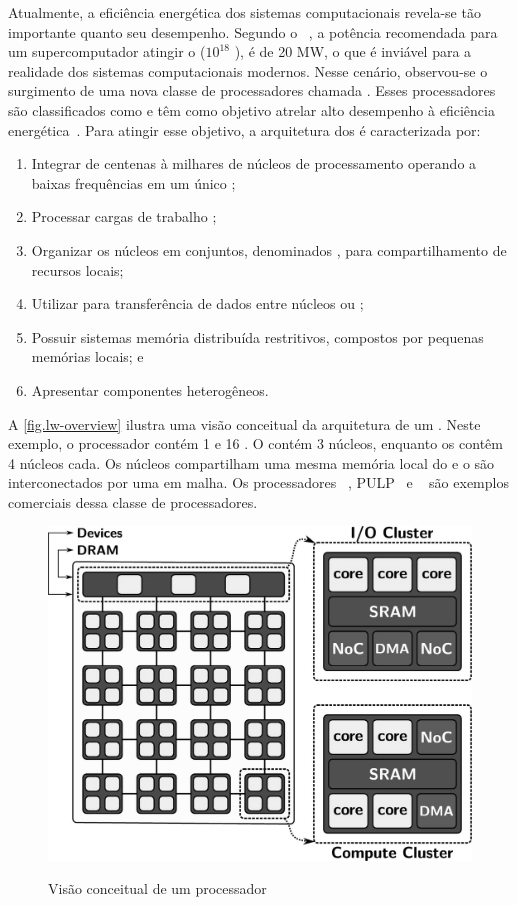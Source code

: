 Atualmente, a eficiência energética dos sistemas computacionais revela-se tão importante quanto seu desempenho. Segundo o \darpa~\cite{darpa:exascale}, a potência recomendada para um supercomputador atingir o \exascale ($10^{18}$ \flops), é de 20 MW, o que é inviável para a realidade dos sistemas computacionais modernos. Nesse cenário, observou-se o surgimento de uma nova classe de processadores chamada \lw. Esses processadores são classificados como \mpsocs e têm como objetivo atrelar alto desempenho à eficiência energética~\cite{francesquini2015}. Para atingir esse objetivo, a arquitetura dos \lws é caracterizada por:
\begin{enumerate}[label=(\roman*)]
    \item Integrar de centenas à milhares de núcleos de processamento operando a baixas frequências em um único \chip;
    \item Processar cargas de trabalho \mimd;
    \item Organizar os núcleos em conjuntos, denominados \clusters, para compartilhamento de recursos locais;
    \item Utilizar \nocs para transferência de dados entre núcleos ou \clusters;
    \item Possuir sistemas memória distribuída restritivos, compostos por pequenas memórias locais; e
    \item Apresentar componentes heterogêneos.
\end{enumerate}
A \autoref{fig.lw-overview} ilustra uma visão conceitual da arquitetura de um \lw. Neste exemplo, o processador contém 1 \iocluster e 16 \cclusters. O \iocluster contém 3 núcleos, enquanto os \cclusters contêm 4 núcleos cada. Os núcleos compartilham uma mesma memória local do \cluster e o \clusters são interconectados por uma \noc em malha. Os processadores \mppa~\cite{dinechin:2013}, PULP~\cite{pulp} e \taihulight~\cite{fu2016sunway} são exemplos comerciais dessa classe de processadores.

\begin{figure}[t]
	\centering
	\caption{Visão conceitual de um processador \lw}
	\includegraphics[width=0.48\linewidth]{content/images/lw-overview-gs.jpg}
    \label{fig.lw-overview}
\end{figure}

